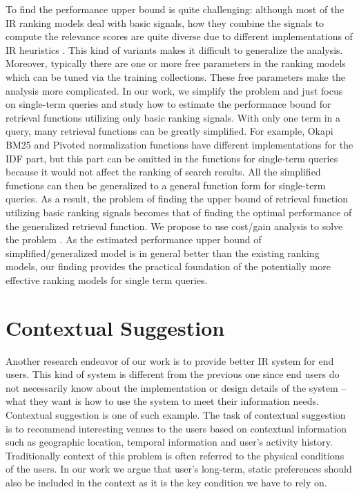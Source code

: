 To find the performance upper bound is quite challenging: although most of 
the IR ranking models deal with basic signals, how they combine the signals 
to compute the relevance scores are quite diverse due to different 
implementations of IR heuristics \cite{Fang:2004:FSI:1008992.1009004}. 
This kind of variants makes it difficult to generalize the analysis. 
Moreover, typically there are one or more free parameters in the ranking 
models which can be tuned via the training collections. 
These free parameters make the analysis more complicated.
In our work, we simplify the problem and just focus on single-term queries 
and study how to estimate the performance bound for retrieval functions 
utilizing only basic ranking signals. 
With only one term in a query, many retrieval functions can be greatly 
simplified. For example, Okapi BM25 and Pivoted normalization functions have 
different implementations for the IDF part, but this part can be omitted in the 
functions for single-term queries because it would not affect the ranking of 
search results. All the simplified functions can then be generalized to a 
general function form for single-term queries. As a result, the problem of 
finding the upper bound of retrieval function utilizing basic ranking signals 
becomes that of finding the optimal performance of the generalized retrieval 
function. We propose to use cost/gain analysis to solve the problem 
\cite{export:132652,export:68133,export:81144}. 
As the estimated performance upper bound of simplified/generalized model is 
in general better than the existing ranking models, our finding provides the 
practical foundation of the potentially more effective ranking models for 
single term queries.

\section{Contextual Suggestion}
Another research endeavor of our work is to provide better IR system for 
end users. This kind of system is different from the previous one since end 
users do not necessarily know about the implementation or design details of 
the system -- what they want is how to use the system to meet their information 
needs. Contextual suggestion is one of such example. 
The task of contextual suggestion is to recommend interesting venues to the 
users based on contextual information such as geographic location, 
temporal information and user's activity history. Traditionally context of 
this problem is often referred to the physical conditions of the users. 
In our work we argue that user's long-term, static preferences should also 
be included in the context as it is the key condition we have to rely on.

